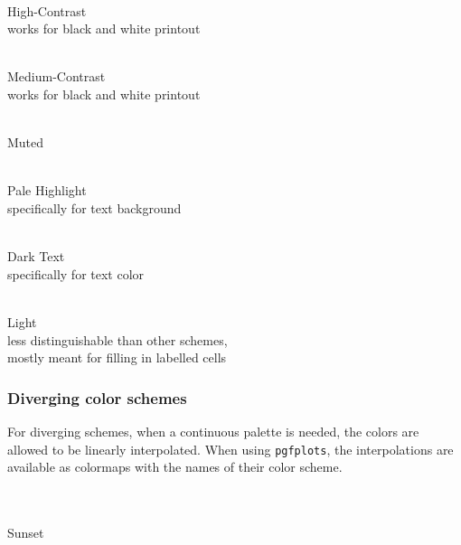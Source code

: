 \documentclass{scrartcl}
\begin{document}
\begin{minipage}{0.5\textwidth}
    \centering
    \\
    High-Contrast\\
    works for black and white printout
\end{minipage}\hfill%
\begin{minipage}{0.5\textwidth}
    \centering
    \\
    Medium-Contrast\\
    works for black and white printout
\end{minipage}

\begin{center}
    \\
    Muted
\end{center}

\begin{minipage}{0.5\textwidth}
    \centering
    \\
    Pale Highlight\\
    specifically for text background
\end{minipage}\hfill%
\begin{minipage}{0.5\textwidth}
    \centering
    \\
    Dark Text\\
    specifically for text color
\end{minipage}

\begin{center}
    \\
    Light\\
    less distinguishable than other schemes,\\ mostly meant for filling in labelled cells
\end{center}\clearpage

\subsubsection{Diverging color schemes}\label{sec:T-D}
For diverging schemes, when a continuous palette is needed, the colors are allowed to be linearly interpolated.
When using \verb!pgfplots!, the interpolations are available as colormaps with the names of their color scheme.

\begin{center}
    \\
    \\
    Sunset
\end{center}
\end{document}
